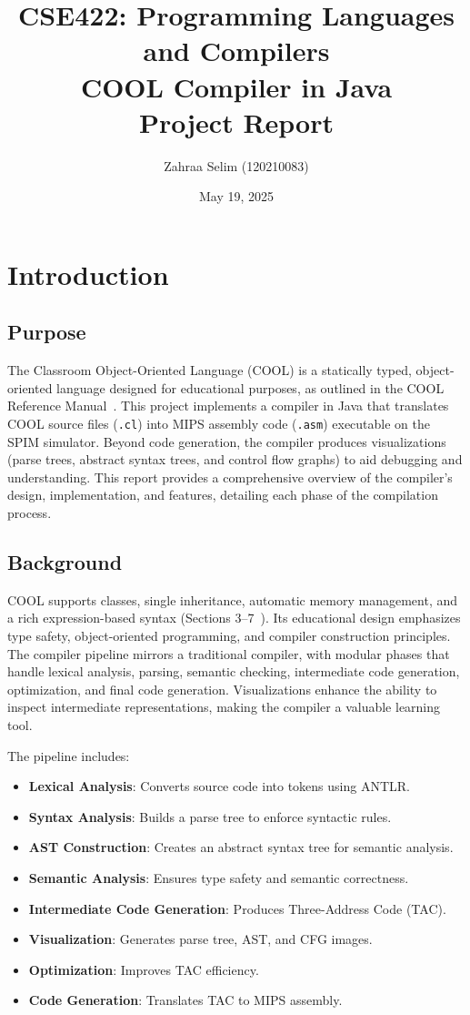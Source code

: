 \documentclass[11pt, titlepage]{article}
\title{CSE422: Programming Languages and Compilers\\COOL Compiler in Java\\Project Report}
\author{Zahraa Selim (120210083)}
\date{May 19, 2025}
\begin{document}
\maketitle
\tableofcontents
\newpage

\section{Introduction}
\label{sec:introduction}

\subsection{Purpose}
The Classroom Object-Oriented Language (COOL) is a statically typed, object-oriented language designed for educational purposes, as outlined in the COOL Reference Manual~\cite{cool_manual}. This project implements a compiler in Java that translates COOL source files (\texttt{.cl}) into MIPS assembly code (\texttt{.asm}) executable on the SPIM simulator. Beyond code generation, the compiler produces visualizations (parse trees, abstract syntax trees, and control flow graphs) to aid debugging and understanding. This report provides a comprehensive overview of the compiler's design, implementation, and features, detailing each phase of the compilation process.

\subsection{Background}
COOL supports classes, single inheritance, automatic memory management, and a rich expression-based syntax (Sections 3--7~\cite{cool_manual}). Its educational design emphasizes type safety, object-oriented programming, and compiler construction principles. The compiler pipeline mirrors a traditional compiler, with modular phases that handle lexical analysis, parsing, semantic checking, intermediate code generation, optimization, and final code generation. Visualizations enhance the ability to inspect intermediate representations, making the compiler a valuable learning tool.

The pipeline includes:
\begin{itemize}[leftmargin=*]
    \item \textbf{Lexical Analysis}: Converts source code into tokens using ANTLR.
    \item \textbf{Syntax Analysis}: Builds a parse tree to enforce syntactic rules.
    \item \textbf{AST Construction}: Creates an abstract syntax tree for semantic analysis.
    \item \textbf{Semantic Analysis}: Ensures type safety and semantic correctness.
    \item \textbf{Intermediate Code Generation}: Produces Three-Address Code (TAC).
    \item \textbf{Visualization}: Generates parse tree, AST, and CFG images.
    \item \textbf{Optimization}: Improves TAC efficiency.
    \item \textbf{Code Generation}: Translates TAC to MIPS assembly.
\end{itemize}
\end{document}
